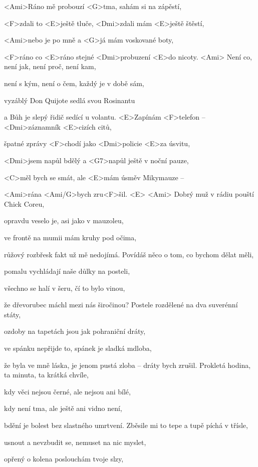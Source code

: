 
\zs
<Ami>Ráno mě probouzí <G>tma, sahám si na zápěstí,

<F>zdali to <E>ještě tluče, <Dmi>zdali mám <E>ještě 
štěstí,

<Ami>nebo je po mně a <G>já mám voskované boty,

<F>ráno co <E>ráno stejné <Dmi>probuzení <E>do nicoty. <Ami>
\ks
\zs
Není co, není jak, není proč, není kam,

není s kým, není o čem, každý je v době sám,

vyzáblý Don Quijote sedlá svou Rosinantu

a Bůh je slepý řidič sedící u volantu.
\ks
\zr
<E>Zapínám <F>telefon -- <Dmi>záznamník <E>cizích citů,

špatné zprávy <F>chodí jako <Dmi>policie <E>za úsvitu,

<Dmi>jsem napůl bdělý a <G7>napůl ještě v noční pauze,

<C>měl bych se smát, ale <E>mám úsměv Mikymauze --

<Ami>rána <Ami/G>bych zru<F>šil. <E> <Ami>
\kr
\zs
Dobrý muž v rádiu pouští Chick Coreu,

opravdu veselo je, asi jako v mauzoleu,

ve frontě na mumii mám kruhy pod očima,

růžový rozbřesk fakt už mě nedojímá.
\ks
\zs
Povídáš něco o tom, co bychom dělat měli,

pomalu vychládají naše důlky na posteli,

všechno se halí v šeru, čí to bylo vinou,

že dřevorubec máchl mezi nás širočinou?
\ks
\zr
Postele rozdělené na dva suverénní státy,

ozdoby na tapetách jsou jak pohraniční dráty,

ve spánku nepřijde to, spánek je sladká mdloba,

že byla ve mně láska, je jenom pustá zloba --
dráty bych zrušil.
\kr
\zs
Prokletá hodina, ta minuta, ta krátká chvíle,

kdy věci nejsou černé, ale nejsou ani bílé,

kdy není tma, ale ještě ani vidno není,

bdění je bolest bez slastného umrtvení.
\ks
\zs
Zběsile mi to tepe a tupě píchá v třísle,

usnout a nevzbudit se, nemuset na nic myslet,

opřený o kolena poslouchám tvoje slzy,

